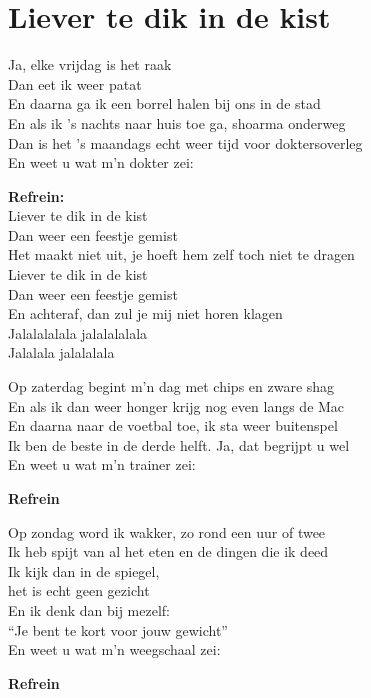 \section{Liever te dik in de kist}
Ja, elke vrijdag is het raak\\
Dan eet ik weer patat\\
En daarna ga ik een borrel halen bij ons in de stad\\
En als ik ’s nachts naar huis toe ga, shoarma onderweg\\
Dan is het ’s maandags echt weer tijd voor doktersoverleg\\
En weet u wat m’n dokter zei:

\textbf{Refrein:}\\
Liever te dik in de kist\\
Dan weer een feestje gemist\\
Het maakt niet uit, je hoeft hem zelf toch
niet te dragen\\
Liever te dik in de kist\\
Dan weer een feestje gemist\\
En achteraf, dan zul je mij niet horen klagen\\
Jalalalalala jalalalalala\\
Jalalala jalalalala

Op zaterdag begint m’n dag met chips en zware shag\\
En als ik dan weer honger krijg nog even langs de Mac\\
En daarna naar de voetbal toe, ik sta weer buitenspel\\
Ik ben de beste in de derde helft. Ja, dat begrijpt u wel\\
En weet u wat m’n trainer zei:

\textbf{Refrein}

Op zondag word ik wakker, zo rond een uur of twee\\
Ik heb spijt van al het eten en de dingen die ik deed\\
Ik kijk dan in de spiegel,\\
het is echt geen gezicht\\
En ik denk dan bij mezelf:\\
“Je bent te kort voor jouw gewicht”\\
En weet u wat m’n weegschaal zei:

\textbf{Refrein}